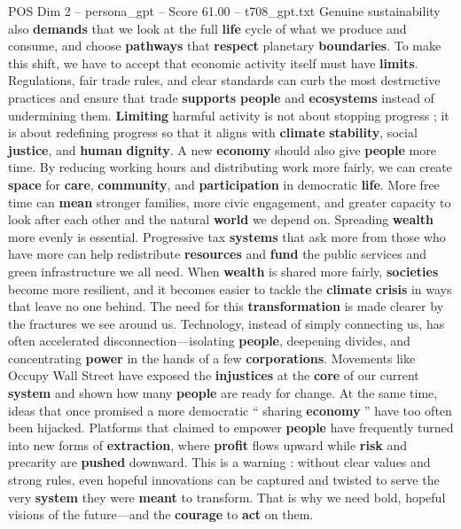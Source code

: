 \begin{textsample}{POS Dim 2 – persona\_gpt – Score 61.00 – t708\_gpt.txt}
Genuine sustainability also \textbf{demands} that we look at the full \textbf{life} cycle of what we produce and consume, and choose \textbf{pathways} that \textbf{respect} planetary \textbf{boundaries}.
To make this shift, we have to accept that economic activity itself must have \textbf{limits}.
Regulations, fair trade rules, and clear standards can curb the most destructive practices and ensure that trade \textbf{supports} \textbf{people} and \textbf{ecosystems} instead of undermining them. \textbf{Limiting} harmful activity is not about stopping progress ; it is about redefining progress so that it aligns with \textbf{climate} \textbf{stability}, social \textbf{justice}, and \textbf{human} \textbf{dignity}.
A new \textbf{economy} should also give \textbf{people} more time.
By reducing working hours and distributing work more fairly, we can create \textbf{space} for \textbf{care}, \textbf{community}, and \textbf{participation} in democratic \textbf{life}.
More free time can \textbf{mean} stronger families, more civic engagement, and greater capacity to look after each other and the natural \textbf{world} we depend on.
Spreading \textbf{wealth} more evenly is essential.
Progressive tax \textbf{systems} that ask more from those who have more can help redistribute \textbf{resources} and \textbf{fund} the public services and green infrastructure we all need.
When \textbf{wealth} is shared more fairly, \textbf{societies} become more resilient, and it becomes easier to tackle the \textbf{climate} \textbf{crisis} in ways that leave no one behind.
The need for this \textbf{transformation} is made clearer by the fractures we see around us.
Technology, instead of simply connecting us, has often accelerated disconnection—isolating \textbf{people}, deepening divides, and concentrating \textbf{power} in the hands of a few \textbf{corporations}.
Movements like Occupy Wall Street have exposed the \textbf{injustices} at the \textbf{core} of our current \textbf{system} and shown how many \textbf{people} are ready for change.
At the same time, ideas that once promised a more democratic “ sharing \textbf{economy} ” have too often been hijacked.
Platforms that claimed to empower \textbf{people} have frequently turned into new forms of \textbf{extraction}, where \textbf{profit} flows upward while \textbf{risk} and precarity are \textbf{pushed} downward.
This is a warning : without clear values and strong rules, even hopeful innovations can be captured and twisted to serve the very \textbf{system} they were \textbf{meant} to transform.
That is why we need bold, hopeful visions of the future—and the \textbf{courage} to \textbf{act} on them.

\end{textsample}
